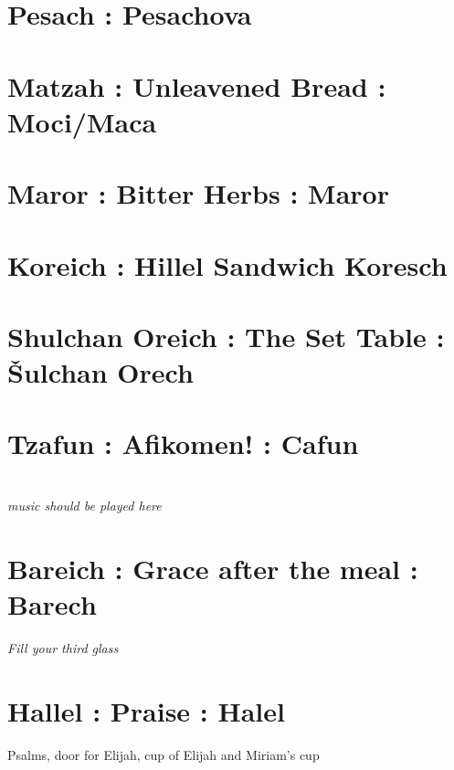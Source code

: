 \documentclass[a5paper,10pt]{memoir}
\begin{document}
\section{Pesach : Pesachova}

\section{Matzah : Unleavened Bread : Moci/Maca}
\HaMotzi
\Matzah

\section{Maror : Bitter Herbs : Maror}
\Maror

\section{Koreich : Hillel Sandwich Koresch}
\Koreich

\section{Shulchan Oreich : The Set Table : Šulchan Orech}

\section{Tzafun : Afikomen! : Cafun}
\\
\textit{music should be played here}

\section{Bareich : Grace after the meal : Barech}
\textit{Fill your third glass}\\
\Bareich
\Kaddeish

\section{Hallel : Praise : Halel}
Psalms, door for Elijah, cup of Elijah and Miriam’s cup

\Hallel
\Elijah
\Miriam
% 
\end{document}
